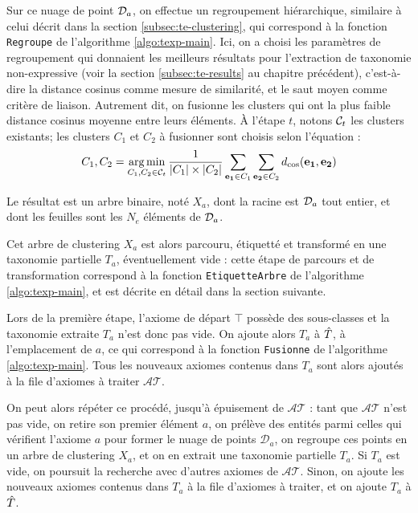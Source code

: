 Sur ce nuage de point $\cal{D}_a$, on effectue un regroupement hiérarchique, similaire à celui décrit dans la section \ref{subsec:te-clustering}, qui correspond à la fonction \texttt{Regroupe} de l'algorithme \ref{algo:texp-main}.
Ici, on a choisi les paramètres de regroupement qui donnaient les meilleurs résultats pour l'extraction de taxonomie non-expressive (voir la section \ref{subsec:te-results} au chapitre précédent), c'est-à-dire la distance cosinus comme mesure de similarité, et le saut moyen comme critère de liaison. Autrement dit, on fusionne les clusters qui ont la plus faible distance cosinus moyenne entre leurs éléments. À l'étape $t$, notons $\cal{C}_t$ les clusters existants; les clusters $C_1$ et $C_2$ à fusionner sont choisis selon l'équation :
\begin{equation}
    C_1, C_2 = \argmin_{C_1, C_2 \in \cal{C}_t} \frac{1}{|C_1| \times |C_2|} \sum_{\bf{e_1}\in C_1} \sum_{\bf{e_2} \in C_2} d_\text{cos}(\bf{e_1, e_2})
\end{equation}

Le résultat est un arbre binaire, noté $X_a$, dont la racine est $\cal{D}_a$ tout entier, et dont les feuilles sont les $N_e$ éléments de $\cal{D}_a$. 

Cet arbre de clustering $X_a$ est alors parcouru, étiquetté et transformé en une taxonomie partielle $T_a$, éventuellement vide : cette étape de parcours et de transformation correspond à la fonction \texttt{EtiquetteArbre} de l'algorithme \ref{algo:texp-main}, et est décrite en détail dans la section suivante.

Lors de la première étape, l'axiome de départ $\top$ possède des sous-classes et la taxonomie extraite $T_a$ n'est donc pas vide. On ajoute alors $T_a$ à $\Tpred$, à l'emplacement de $a$, ce qui correspond à la fonction \texttt{Fusionne} de l'algorithme \ref{algo:texp-main}. Tous les nouveaux axiomes contenus dans $T_a$ sont alors ajoutés à la file d'axiomes à traiter $\mathcal{AT}$.

On peut alors répéter ce procédé, jusqu'à épuisement de $\mathcal{AT}$ : tant que $\mathcal{AT}$ n'est pas vide, on retire son premier élément $a$, on prélève des entités parmi celles qui vérifient l'axiome $a$ pour former le nuage de points $\mathcal{D}_a$, on regroupe ces points en un arbre de clustering $X_a$, et on en extrait une taxonomie partielle $T_a$. Si $T_a$ est vide, on poursuit la recherche avec d'autres axiomes de $\mathcal{AT}$. Sinon, on ajoute les nouveaux axiomes contenus dans $T_a$ à la file d'axiomes à traiter, et on ajoute $T_a$ à $\Tpred$.

